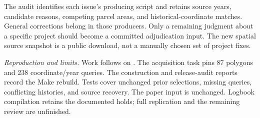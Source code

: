 The audit identifies each issue's producing script and retains source years,
candidate reasons, competing parcel areas, and historical-coordinate matches.
General corrections belong in those producers. Only a remaining judgment about
a specific project should become a committed adjudication input. The new spatial
source snapshot is a public download, not a manually chosen set of project fixes.

\textit{Reproduction and limits.} Work follows  on
. The acquisition task pins 87 polygons and 238 coordinate/year queries. The
construction and release-audit reports record the Make rebuild. Tests cover
unchanged prior selections, missing queries, conflicting histories, and source
recovery. The paper input is unchanged. Logbook compilation retains the documented
holds; full replication and the remaining review are unfinished.

